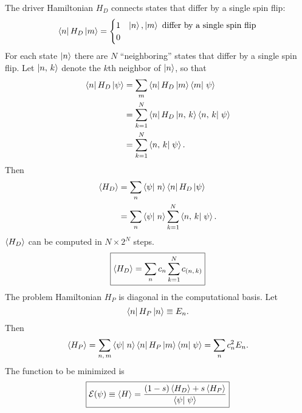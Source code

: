 The driver Hamiltonian $H_D$ connects states that differ by a single spin flip:
\begin{equation}
  \matrixel{n}{H_D}{m}
  = \begin{cases}
    1 & \ket{n}, \ket{m} \text{ differ by a single spin flip} \\
    0
  \end{cases}
  \label{}
\end{equation}
For each state $\left| n \right>$ there are $N$ ``neighboring'' states that differ by a
single spin flip. Let $\left| n,\,k \right>$ denote the $k$th neighbor of
$\left| n \right>$, so that
\begin{align}
  \matrixel{n}{H_D}{\psi}
  &= \sum_m \matrixel{n}{H_D}{m} \braket{m}{\psi} \\
  &= \sum_{k=1}^N \matrixel{n}{H_D}{\nghbr{n}{k}} \braket{\nghbr{n}{k}}{\psi} \\
  &= \sum_{k=1}^N \braket{\nghbr{n}{k}}{\psi}.
  \label{}
\end{align}
Then
\begin{align}
  \avg{H_D}
  &= \sum_n \braket{\psi}{n} \matrixel{n}{H_D}{\psi} \\
  &= \sum_n \braket{\psi}{n} \sum_{k=1}^{N} \braket{\nghbr{n}{k}}{\psi}.
  \label{}
\end{align}
$\left< H_D \right>$ can be computed in $N \times 2^N$ steps.
\begin{equation}
  \boxed{
    \left< H_D \right> = \sum_n c_n \sum_{k=1}^N c_{(n,\,k)}
  }
  \label{}
\end{equation}
The problem Hamiltonian $H_P$ is diagonal in the computational basis. Let
\begin{equation}
  \matrixel{n}{H_P}{n} \equiv E_n.
  \label{}
\end{equation}
Then
\begin{equation}
  \avg{H_P}
  = \sum_{n,\,m} \braket{\psi}{n} \matrixel{n}{H_P}{m} \braket{m}{\psi}
  = \sum_n c_n^2 E_n.
  \label{}
\end{equation}
The function to be minimized is
\begin{equation}
  \boxed{
  \mathcal{E}(\psi) 
  \equiv \avg{H}
  = \frac{(1-s) \avg{H_D} + s \avg{H_P}}{\braket{\psi}{\psi}}
  }
  \label{}
\end{equation}

